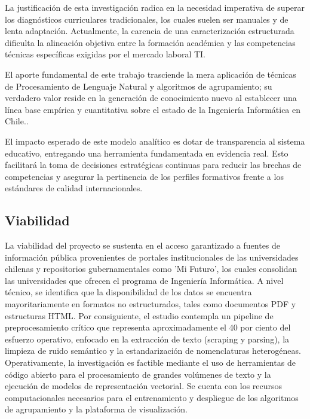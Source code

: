 \documentclass[journal,twoside,web]{ieeecolor}
\begin{document}
La justificación de esta investigación radica en la necesidad imperativa de superar los diagnósticos curriculares tradicionales, los cuales suelen ser manuales y de lenta adaptación. Actualmente, la carencia de una caracterización estructurada dificulta la alineación objetiva entre la formación académica y las competencias técnicas específicas exigidas por el mercado laboral TI\cite{ITTalent2021}.

El aporte fundamental de este trabajo trasciende la mera aplicación de técnicas de Procesamiento de Lenguaje Natural y algoritmos de agrupamiento; su verdadero valor reside en la generación de conocimiento nuevo al establecer una línea base empírica y cuantitativa sobre el estado de la Ingeniería Informática en Chile..

El impacto esperado de este modelo analítico es dotar de transparencia al sistema educativo, entregando una herramienta fundamentada en evidencia real. Esto facilitará la toma de decisiones estratégicas continuas para reducir las brechas de competencias y asegurar la pertinencia de los perfiles formativos frente a los estándares de calidad internacionales.

\subsection{Viabilidad} \label{Viabilidad}

La viabilidad del proyecto se sustenta en el acceso garantizado a fuentes de información pública provenientes de portales institucionales de las universidades chilenas y repositorios gubernamentales como 'Mi Futuro'\cite{mifuturo_buscador}, los cuales consolidan las universidades que ofrecen el programa de Ingeniería Informática.  A nivel técnico, se identifica que la disponibilidad de los datos se encuentra mayoritariamente en formatos no estructurados, tales como documentos PDF y estructuras HTML. Por consiguiente, el estudio contempla un pipeline de preprocesamiento crítico que representa aproximadamente el 40 por ciento del esfuerzo operativo, enfocado en la extracción de texto (scraping y parsing), la limpieza de ruido semántico y la estandarización de nomenclaturas heterogéneas.  Operativamente, la investigación es factible mediante el uso de herramientas de código abierto para el procesamiento de grandes volúmenes de texto y la ejecución de modelos de representación vectorial. Se cuenta con los recursos computacionales necesarios para el entrenamiento y despliegue de los algoritmos de agrupamiento y la plataforma de visualización.




\end{document}
